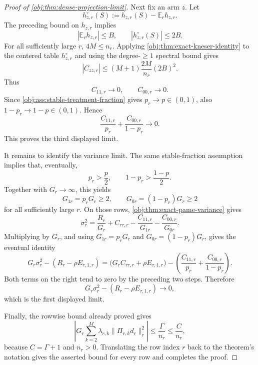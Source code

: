 \begin{proof}[Proof of \cref{obj:thm:dense-projection-limit}]
Next fix an arm \(z\).  Let
\[
h_{z,r}^{\circ}(S):=h_{z,r}(S)-\mathbb E_r h_{z,r}.
\]
The preceding bound on \(h_{z,r}\) implies
\[
|\mathbb E_r h_{z,r}|\le B,
\qquad
|h_{z,r}^{\circ}(S)|\le2B .
\]
For all sufficiently large \(r\), \(4M\le n_r\).  Applying \cref{obj:thm:exact-kneser-identity} to the centered table \(h_{z,r}^{\circ}\) and using the degree-\(\ge1\) spectral bound gives
\[
|C_{zz,r}|
\le
(M+1)\frac{2M}{n_r}(2B)^2 .
\]
Thus
\[
C_{11,r}\to0,
\qquad
C_{00,r}\to0 .
\]
Since \cref{obj:ass:stable-treatment-fraction} gives \(p_r\to p\in(0,1)\), also \(1-p_r\to1-p\in(0,1)\).  Hence
\[
\frac{C_{11,r}}{p_r}
+
\frac{C_{00,r}}{1-p_r}
\to0 .
\]
This proves the third displayed limit.

It remains to identify the variance limit.  The same stable-fraction assumption implies that, eventually,
\[
p_r>\frac p2,
\qquad
1-p_r>\frac{1-p}{2}.
\]
Together with \(G_r\to\infty\), this yields
\[
G_{1r}=p_rG_r\ge2,
\qquad
G_{0r}=(1-p_r)G_r\ge2
\]
for all sufficiently large \(r\).  On those rows, \cref{obj:thm:exact-pame-variance} gives
\[
\sigma_r^2
=
\frac{R_r}{G_r}
+
C_{\tau\tau,r}
-
\frac{C_{11,r}}{G_{1r}}
-
\frac{C_{00,r}}{G_{0r}} .
\]
Multiplying by \(G_r\), and using \(G_{1r}=p_rG_r\) and \(G_{0r}=(1-p_r)G_r\), gives the eventual identity
\[
G_r\sigma_r^2-(R_r-\rho E_{\tau,1,r})
=
\bigl(G_rC_{\tau\tau,r}+\rho E_{\tau,1,r}\bigr)
-
\left(
\frac{C_{11,r}}{p_r}
+
\frac{C_{00,r}}{1-p_r}
\right).
\]
Both terms on the right tend to zero by the preceding two steps.  Therefore
\[
G_r\sigma_r^2-(R_r-\rho E_{\tau,1,r})\to0,
\]
which is the first displayed limit.

Finally, the rowwise bound already proved gives
\[
\left|
G_r\sum_{k=2}^{M}\lambda_{r,k}\|\Pi_{r,k}d_r\|_r^2
\right|
\le
\frac{\Gamma}{n_r}
\le
\frac{C}{n_r},
\]
because \(C=\Gamma+1\) and \(n_r>0\).  Translating the row index \(r\) back to the theorem's notation gives the asserted bound for every row and completes the proof.
\end{proof}
